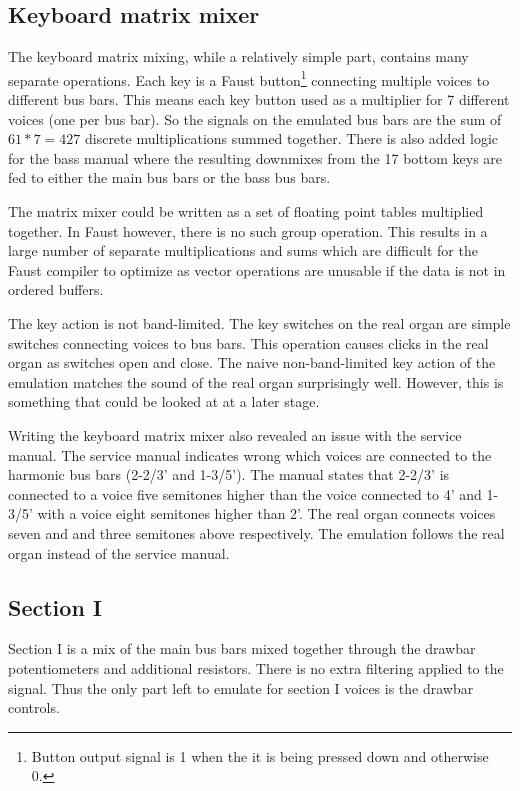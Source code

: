 \documentclass[11pt,a4paper]{article}
\begin{document}
\subsection{Keyboard matrix mixer}

The keyboard matrix mixing, while a relatively simple part, contains many separate operations. Each key is a Faust button\footnote{Button output signal is 1 when the it is being pressed down and otherwise 0.} connecting multiple voices to different bus bars. This means each key button used as a multiplier for 7 different voices (one per bus bar). So the signals on the emulated bus bars are the sum of $61*7 = 427$ discrete multiplications summed together. There is also added logic for the bass manual where the resulting downmixes from the 17 bottom keys are fed to either the main bus bars or the bass bus bars.

The matrix mixer could be written as a set of floating point tables multiplied together. In Faust however, there is no such group operation. This results in a large number of separate multiplications and sums which are difficult for the Faust compiler to optimize as vector operations are unusable if the data is not in ordered buffers.

The key action is not band-limited. The key switches on the real organ are simple switches connecting voices to bus bars. This operation causes clicks in the real organ as switches open and close. The naive non-band-limited key action of the emulation matches the sound of the real organ surprisingly well. However, this is something that could be looked at at a later stage.

Writing the keyboard matrix mixer also revealed an issue with the service manual. The service manual indicates wrong which voices are connected to the harmonic bus bars (2-2/3' and 1-3/5'). The manual states that 2-2/3' is connected to a voice five semitones higher than the voice connected to 4' and 1-3/5' with a voice eight semitones higher than 2'. The real organ connects voices seven and and three semitones above respectively. The emulation follows the real organ instead of the service manual.

\subsection{Section I}
\label{section:section-I}

Section I is a mix of the main bus bars mixed together through the drawbar potentiometers and additional resistors. There is no extra filtering applied to the signal. Thus the only part left to emulate for section I voices is the drawbar controls.
\end{document}

